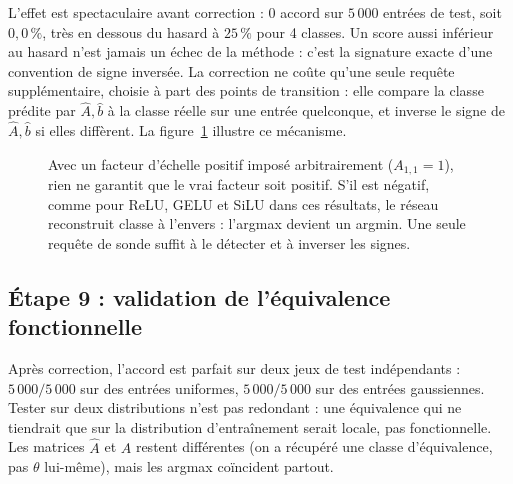 \documentclass[11pt]{article}
\begin{document}
L'effet est spectaculaire avant correction : $0$ accord sur $5\,000$ entrées
de test, soit $0{,}0\,\%$, très en dessous du hasard à $25\,\%$ pour 4
classes. Un score aussi inférieur au hasard n'est jamais un échec de la
méthode : c'est la signature exacte d'une convention de signe inversée. La
correction ne coûte qu'une seule requête supplémentaire, choisie à part des
points de transition : elle compare la classe prédite par $\hat A, \hat b$ à
la classe réelle sur une entrée quelconque, et inverse le signe de $\hat A,
\hat b$ si elles diffèrent. La figure~\ref{fig:signe} illustre ce
mécanisme.

\begin{figure}[h]
\centering
{}
\caption{Avec un facteur d'échelle positif imposé arbitrairement
($A_{1,1}=1$), rien ne garantit que le vrai facteur soit positif. S'il est
négatif, comme pour ReLU, GELU et SiLU dans ces résultats, le réseau
reconstruit classe à l'envers : l'argmax devient un argmin. Une seule
requête de sonde suffit à le détecter et à inverser les signes.}
\label{fig:signe}
\end{figure}

\subsection*{Étape 9 : validation de l'équivalence fonctionnelle}

Après correction, l'accord est parfait sur deux jeux de test indépendants :
$5\,000/5\,000$ sur des entrées uniformes, $5\,000/5\,000$ sur des entrées
gaussiennes. Tester sur deux distributions n'est pas redondant : une
équivalence qui ne tiendrait que sur la distribution d'entraînement serait
locale, pas fonctionnelle. Les matrices $\hat A$ et $A$ restent différentes
(on a récupéré une classe d'équivalence, pas $\theta$ lui-même), mais les
arg\-max coïncident partout.
\end{document}
